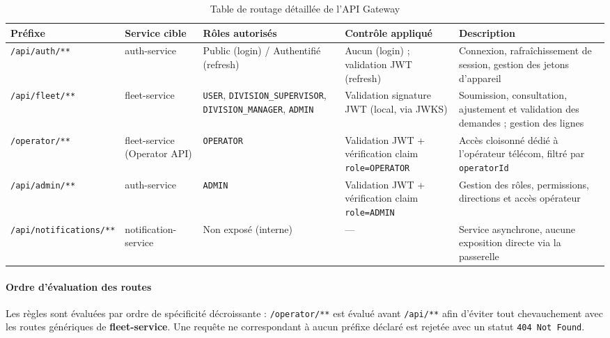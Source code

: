 \documentclass[11pt,a4paper]{article}
\begin{document}
\begin{table}[H]
\centering
\small
\begin{tabular}{|p{2.6cm}|p{2.3cm}|p{2.6cm}|p{3cm}|p{3.2cm}|}
\hline
\textbf{Préfixe} & \textbf{Service cible} & \textbf{Rôles autorisés} & \textbf{Contrôle appliqué} & \textbf{Description} \\
\hline
\texttt{/api/auth/**} & auth-service & Public (login) / Authentifié (refresh) & Aucun (login) ; validation JWT (refresh) & Connexion, rafraîchissement de session, gestion des jetons d'appareil \\
\hline
\texttt{/api/fleet/**} & fleet-service & \texttt{USER}, \texttt{DIVISION\_SUPERVISOR}, \texttt{DIVISION\_MANAGER}, \texttt{ADMIN} & Validation signature JWT (local, via JWKS) & Soumission, consultation, ajustement et validation des demandes ; gestion des lignes \\
\hline
\texttt{/operator/**} & fleet-service (Operator API) & \texttt{OPERATOR} & Validation JWT + vérification claim \texttt{role=OPERATOR} & Accès cloisonné dédié à l'opérateur télécom, filtré par \texttt{operatorId} \\
\hline
\texttt{/api/admin/**} & auth-service & \texttt{ADMIN} & Validation JWT + vérification claim \texttt{role=ADMIN} & Gestion des rôles, permissions, directions et accès opérateur \\
\hline
\texttt{/api/notifications/**} & notification-service & Non exposé (interne) & --- & Service asynchrone, aucune exposition directe via la passerelle \\
\hline
\end{tabular}
\caption{Table de routage détaillée de l'API Gateway}
\label{tab:routing-table}
\end{table}

\paragraph{Ordre d'évaluation des routes}
Les règles sont évaluées par ordre de spécificité décroissante : \texttt{/operator/**} est
évalué avant \texttt{/api/**} afin d'éviter tout chevauchement avec les routes génériques
de \textbf{fleet-service}. Une requête ne correspondant à aucun préfixe déclaré est rejetée
avec un statut \texttt{404 Not Found}.
\end{document}
